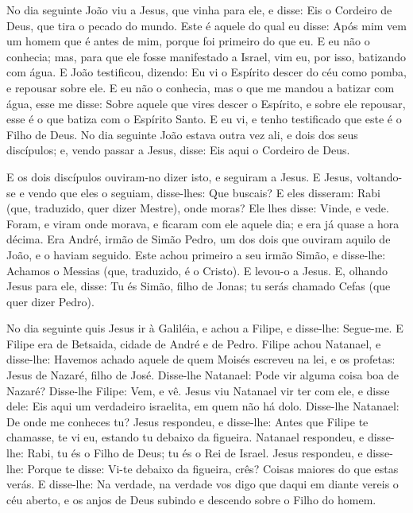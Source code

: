 No dia seguinte João viu a Jesus, que vinha para ele, e disse:
Eis o Cordeiro de Deus, que tira o pecado do mundo. Este é
aquele do qual eu disse: Após mim vem um homem que é antes de mim,
porque foi primeiro do que eu. E eu não o conhecia; mas, para
que ele fosse manifestado a Israel, vim eu, por isso, batizando com
água. E João testificou, dizendo: Eu vi o Espírito descer do
céu como pomba, e repousar sobre ele. E eu não o conhecia,
mas o que me mandou a batizar com água, esse me disse: Sobre aquele
que vires descer o Espírito, e sobre ele repousar, esse é o que
batiza com o Espírito Santo. E eu vi, e tenho testificado que
este é o Filho de Deus. No dia seguinte João estava outra vez
ali, e dois dos seus discípulos; e, vendo passar a Jesus,
disse: Eis aqui o Cordeiro de Deus.

E os dois discípulos ouviram-no dizer isto, e seguiram a Jesus.
E Jesus, voltando-se e vendo que eles o seguiam, disse-lhes:
Que buscais? E eles disseram: Rabi (que, traduzido, quer dizer
Mestre), onde moras? Ele lhes disse: Vinde, e vede. Foram, e
viram onde morava, e ficaram com ele aquele dia; e era já quase a
hora décima. Era André, irmão de Simão Pedro, um dos dois que
ouviram aquilo de João, e o haviam seguido. Este achou
primeiro a seu irmão Simão, e disse-lhe: Achamos o Messias (que,
traduzido, é o Cristo). E levou-o a Jesus. E, olhando Jesus
para ele, disse: Tu és Simão, filho de Jonas; tu serás chamado Cefas
(que quer dizer Pedro).

No dia seguinte quis Jesus ir à Galiléia, e achou a Filipe, e
disse-lhe: Segue-me. E Filipe era de Betsaida, cidade de
André e de Pedro. Filipe achou Natanael, e disse-lhe: Havemos
achado aquele de quem Moisés escreveu na lei, e os profetas: Jesus
de Nazaré, filho de José. Disse-lhe Natanael: Pode vir alguma
coisa boa de Nazaré? Disse-lhe Filipe: Vem, e vê. Jesus viu
Natanael vir ter com ele, e disse dele: Eis aqui um verdadeiro
israelita, em quem não há dolo. Disse-lhe Natanael: De onde
me conheces tu? Jesus respondeu, e disse-lhe: Antes que Filipe te
chamasse, te vi eu, estando tu debaixo da figueira. Natanael
respondeu, e disse-lhe: Rabi, tu és o Filho de Deus; tu és o Rei de
Israel. Jesus respondeu, e disse-lhe: Porque te disse: Vi-te
debaixo da figueira, crês? Coisas maiores do que estas verás.
E disse-lhe: Na verdade, na verdade vos digo que daqui em
diante vereis o céu aberto, e os anjos de Deus subindo e descendo
sobre o Filho do homem.

\medskip

